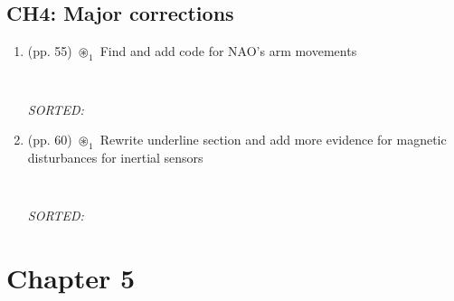 \documentclass[12pt]{article}
\begin{document}
\subsection{CH4: Major corrections}
\begin{enumerate}

\item  (pp. 55) $\circledast_1$ 
	Find and add code for NAO's arm movements
	\begin{verbatim}
	
	\end{verbatim}
	\textit{
	SORTED:  
	}
	\\


\item  (pp. 60) $\circledast_1$ 
	Rewrite underline section and
	add more evidence for magnetic 
	disturbances for inertial sensors
	\begin{verbatim}
	
	\end{verbatim}
	\textit{
	SORTED:  
	}
	\\


\end{enumerate}







\section{Chapter 5}
\end{document}
